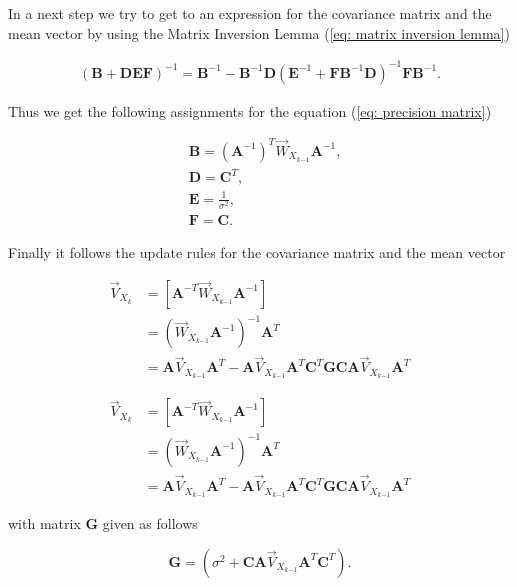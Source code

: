 \documentclass[11pt,a4paper,twoside]{report}
\newcommand{\messF}[3]{\vec{#1}_{{#2}_{k{#3}}}}
\newcommand{\mat}[1]{\mathbf{#1}}
\begin{document}
In a next step we try to get to an expression for the covariance matrix and the mean vector by using the Matrix Inversion Lemma (\ref{eq: matrix inversion lemma})
 
\begin{align}
	\label{eq: matrix inversion lemma}
	\left(\mat{B} + \mat{DEF}\right)^{-1} = \mat{B}^{-1} - \mat{B}^{-1}\mat{D}\left(\mat{E}^{-1} + \mat{F}\mat{B}^{-1}\mat{D}\right)^{-1}\mat{F}\mat{B}^{-1}.
\end{align}

Thus we get the following assignments for the equation (\ref{eq: precision matrix})

\begin{align}
	\label{eq: assignments MIL}
	& \mat{B} = \left(\mat{A}^{-1}\right)^T\messF{W}{X}{-1}\mat{A}^{-1}, \\
	& \mat{D} = \mat{C}^T, \\
	& \mat{E} = \frac{1}{\sigma^2}, \\
	& \mat{F} = \mat{C}.
\end{align}

Finally it follows the update rules for the covariance matrix and the mean vector

\begin{align}
	\label{eq: update rule, covariance}
	\messF{V}{X}{} &= \left[\mat{A}^{-T}\messF{W}{X}{-1}\mat{A}^{-1}\right] \\
	\nonumber
	&= \left(\messF{W}{X}{-1}\mat{A}^{-1}\right)^{-1}\mat{A}^T \\
	\nonumber
	&= \mat{A}\messF{V}{X}{-1}\mat{A}^T - \mat{A}\messF{V}{X}{-1}\mat{A}^T\mat{C}^T\mat{GCA}\messF{V}{X}{-1}\mat{A}^T
\end{align}

\begin{align}
	\label{eq: update rule, covariance}
	\messF{V}{X}{} &= \left[\mat{A}^{-T}\messF{W}{X}{-1}\mat{A}^{-1}\right] \\
	\nonumber
	&= \left(\messF{W}{X}{-1}\mat{A}^{-1}\right)^{-1}\mat{A}^T \\
	\nonumber
	&= \mat{A}\messF{V}{X}{-1}\mat{A}^T - \mat{A}\messF{V}{X}{-1}\mat{A}^T\mat{C}^T\mat{GCA}\messF{V}{X}{-1}\mat{A}^T
\end{align}

with matrix $\mat{G}$ given as follows

\begin{equation*}
	\mat{G} = \left(\sigma^2 + \mat{CA}\messF{V}{X}{-1}\mat{A}^T\mat{C}^{T}\right).
\end{equation*}
\end{document}
